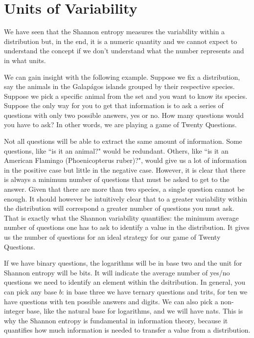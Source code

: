 \documentclass{article}
\begin{document}
\section{Units of Variability\label{uv}}



We have seen that the Shannon entropy measures the variability within a distribution but, in the end, it is a numeric quantity and we cannot expect to understand the concept if we don't understand what the number represents and in what units.

We can gain insight with the following example. Suppose we fix a distribution, say the animals in the Galap\'{a}gos islands grouped by their respective species. Suppose we pick a specific animal from the set and you want to know its species. Suppose the only way for you to get that information is to ask a series of questions with only two possible answers, yes or no. How many questions would you have to ask? In other words, we are playing a game of Twenty Questions.

Not all questions will be able to extract the same amount of information. Some questions, like ``is it an animal?" would be redundant. Others, like ``is it an American Flamingo (Phoenicopterus ruber)?", would give us a lot of information in the positive case but little in the negative case. However, it is clear that there is always a minimum number of questions that must be asked to get to the answer. Given that there are more than two species, a single question cannot be enough. It should however be intuitively clear that to a greater variability within the distribution will correspond a greater number of questions you must ask. That is exactly what the Shannon variability quantifies: the minimum average number of questions one has to ask to identify a value in the distribution. It gives us the number of questions for an ideal strategy for our game of Twenty Questions.

If we have binary questions, the logarithms will be in base two and the unit for Shannon entropy will be bits. It will indicate the average number of yes/no questions we need to identify an element within the dsitribution. In general, you can pick any base $b$: in base three we have ternary questions and trits, for ten we have questions with ten possible answers and digits. We can also pick a non-integer base, like the natural base for logarithms, and we will have nats. This is why the Shannon entropy is fundamental in information theory, because it quantifies how much information is needed to transfer a value from a distribution.
\end{document}
